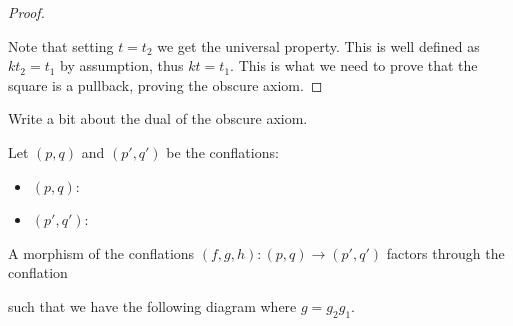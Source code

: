 \begin{proof}
\begin{center}
        \end{center}
        Note that setting $t=t_2$ we get the universal property. This is well defined as $kt_2=t_1$ by assumption, thus $kt=t_1$. This is what we need to prove that the square is a pullback, proving the obscure axiom.
    \end{proof}

    \begin{remark}
        Write a bit about the dual of the obscure axiom.
    \end{remark}

    \begin{lemma}
        Let $(p,q)$ and $(p',q')$ be the conflations:
        \begin{itemize}
            \item $(p,q)$: 
            \item $(p',q')$: 
        \end{itemize}
        A morphism of the conflations $(f,g,h):(p,q)\rightarrow (p',q')$ factors through the conflation 
         such that we have the following diagram where $g = g_2g_1$.
        \begin{center}
        \end{center}
    \end{lemma}

